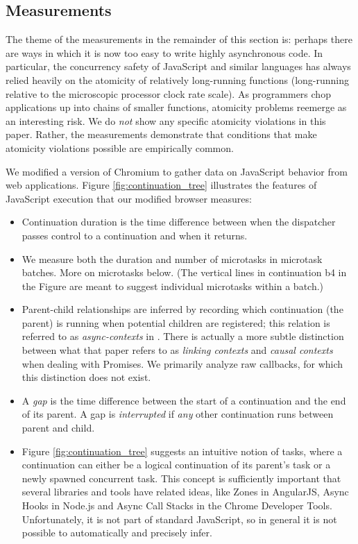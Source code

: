 \documentclass[acmsmall,anonymous,review]{acmart}\settopmatter{printfolios=true,printccs=false,printacmref=false}
\begin{document}
\subsection{Measurements}

The theme of the measurements in the remainder of this section is: perhaps there are ways in which it is now too easy to write highly asynchronous code.
In particular, the concurrency safety of JavaScript and similar languages has always relied heavily on the atomicity of relatively long-running functions (long-running relative to the microscopic processor clock rate scale).
As programmers chop applications up into chains of smaller functions, atomicity problems reemerge as an interesting risk.
We do \emph{not} show any specific atomicity violations in this paper.
Rather, the measurements demonstrate that conditions that make atomicity violations possible are empirically common.

We modified a version of Chromium to gather data on JavaScript behavior from web applications.
Figure \ref{fig:continuation_tree} illustrates the features of JavaScript execution that our modified browser measures:

\begin{itemize}
\item Continuation duration is the time difference between when the dispatcher passes control to a continuation and when it returns.
\item We measure both the duration and number of microtasks in microtask batches.
  More on microtasks below.
  (The vertical lines in continuation \textsf{b4} in the Figure are meant to suggest individual microtasks within a batch.)
\item Parent-child relationships are inferred by recording which continuation (the parent) is running when potential children are registered; this relation is referred to as \emph{async-contexts} in \cite{Loring2017}.
  There is actually a more subtle distinction between what that paper refers to as \emph{linking contexts} and \emph{causal contexts} when dealing with Promises.
  We primarily analyze raw callbacks, for which this distinction does not exist.
\item A \emph{gap} is the time difference between the start of a continuation and the end of its parent.
  A gap is \emph{interrupted} if \emph{any} other continuation runs between parent and child.
\item Figure \ref{fig:continuation_tree} suggests an intuitive notion of tasks, where a continuation can either be a logical continuation of its parent's task or a newly spawned concurrent task.
  This concept is sufficiently important that several libraries and tools have related ideas, like Zones in AngularJS, Async Hooks in Node.js and Async Call Stacks in the Chrome Developer Tools.
  Unfortunately, it is not part of standard JavaScript, so in general it is not possible to automatically and precisely infer.
\end{itemize}
\end{document}
